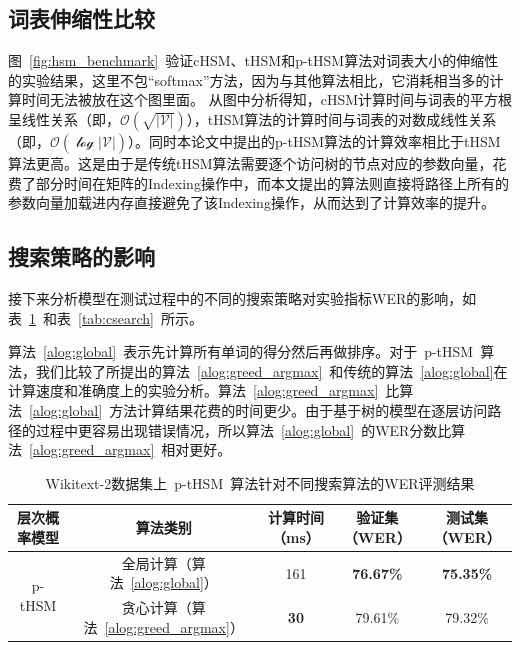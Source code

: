 \subsection{词表伸缩性比较}
图~\ref{fig:hsm_benchmark}~验证cHSM、tHSM和p-tHSM算法对词表大小的伸缩性的实验结果，这里不包``softmax''方法，因为与其他算法相比，它消耗相当多的计算时间无法被放在这个图里面。 从图中分析得知，cHSM计算时间与词表的平方根呈线性关系（即，$\mathcal{O(\sqrt{|V|})}$），tHSM算法的计算时间与词表的对数成线性关系 （即，$\mathcal{O(\log{|V|})}$）。同时本论文中提出的p-tHSM算法的计算效率相比于tHSM算法更高。这是由于是传统tHSM算法需要逐个访问树的节点对应的参数向量，花费了部分时间在矩阵的Indexing操作中，而本文提出的算法则直接将路径上所有的参数向量加载进内存直接避免了该Indexing操作，从而达到了计算效率的提升。


\subsection{搜索策略的影响}
接下来分析模型在测试过程中的不同的搜索策略对实验指标WER的影响，如表~\ref{tab:psearch}~和表~\ref{tab:csearch}~所示。


算法~\ref{alog:global}~表示先计算所有单词的得分然后再做排序。对于~p-tHSM~算法，我们比较了所提出的算法~\ref{alog:greed_argmax}~和传统的算法~\ref{alog:global}在计算速度和准确度上的实验分析。算法~\ref{alog:greed_argmax}~比算法~\ref{alog:global}~方法计算结果花费的时间更少。由于基于树的模型在逐层访问路径的过程中更容易出现错误情况，所以算法~\ref{alog:global}~的WER分数比算法~\ref{alog:greed_argmax}~相对更好。
\begin{table}[!ht]
  \centering
  \caption{Wikitext-2数据集上~p-tHSM~算法针对不同搜索算法的WER评测结果\label{tab:psearch}}
\begin{tabular}{ccccc}
  \toprule
     层次概率模型   & 算法类别&计算时间（ms）&验证集（WER）& 测试集（WER）\\ \midrule
  \multirow{2}{*}{p-tHSM}  &全局计算（算法~\ref{alog:global}）&161& \textbf{76.67\%}&\textbf{75.35\%}\\
        &贪心计算（算法~\ref{alog:greed_argmax}）&\textbf{30} & 79.61\%&79.32\%\\
  \bottomrule
\end{tabular}
\end{table}

